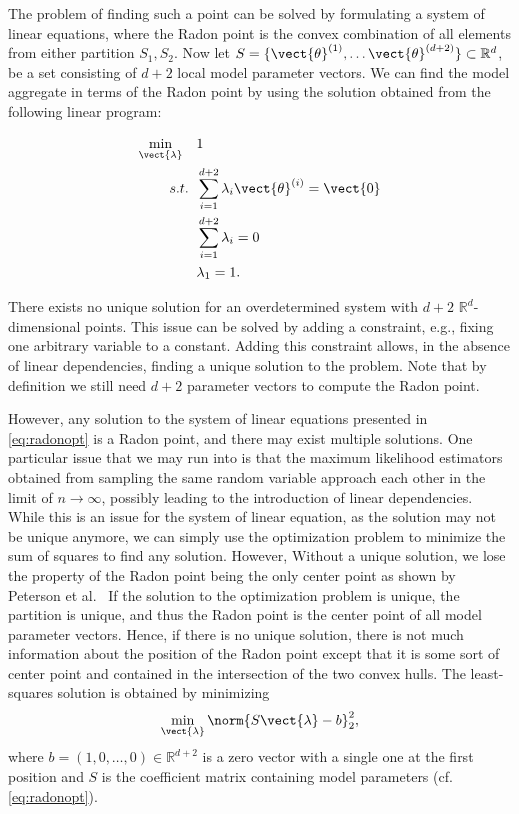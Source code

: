 The problem of finding such a point can be solved by formulating a system of linear equations, where the Radon point is the convex combination of all elements from either partition $S_1, S_2$.
Now let $S = \{\vect{\theta}^{(1)}, \ldots \vect{\theta}^{(d+2)}\} \subset \mathbb{R}^d$, be a set consisting of $d+2$ local model parameter vectors.
We can find the model aggregate in terms of the Radon point by using the solution obtained from the following linear program:

\begin{equation}
    \label{eq:radonopt}
    \begin{split}
        \min_{\vect{\lambda}} \quad &1 \\
        s.t. \;\; &\sum_{i=1}^{d+2} \lambda_i \vect{\theta}^{(i)} = \vect{0}\\
             \;\; &\sum_{i=1}^{d+2} \lambda_i = 0 \\
             \; \; & \lambda_1 = 1.
    \end{split}
\end{equation}

There exists no unique solution for an overdetermined system with $d+2$ $\mathbb{R}^d$-dimensional points.
This issue can be solved by adding a constraint, e.g., fixing one arbitrary variable to a constant. 
Adding this constraint allows, in the absence of linear dependencies, finding a unique solution to the problem.
Note that by definition we still need $d+2$ parameter vectors to compute the Radon point.

However, any solution to the system of linear equations presented in \autoref{eq:radonopt} is a Radon point, and there may exist multiple solutions.
One particular issue that we may run into is that the maximum likelihood estimators obtained from sampling the same random variable approach each other in the limit of $n \rightarrow \infty$, possibly leading to the introduction of linear dependencies.
While this is an issue for the system of linear equation, as the solution may not be unique anymore, we can simply use the optimization problem to minimize the sum of squares to find any solution.
However, Without a unique solution, we lose the property of the Radon point being the only center point as shown by Peterson et al.~\cite{peterson1972geometry}
If the solution to the optimization problem is unique, the partition is unique, and thus the Radon point is the center point of all model parameter vectors.
Hence, if there is no unique solution, there is not much information about the position of the Radon point except that it is some sort of center point and contained in the intersection of the two convex hulls.
The least-squares solution is obtained by minimizing
\begin{equation}
    \label{eq:lstsq}
        \min_{\vect{\lambda}} \norm{S\vect{\lambda} - b}^2_2,
\end{equation}
where $b=(1, 0, \ldots, 0) \in \mathbb{R}^{d+2}$ is a zero vector with a single one at the first position and $S$ is the coefficient matrix containing model parameters (cf. \autoref{eq:radonopt}).

